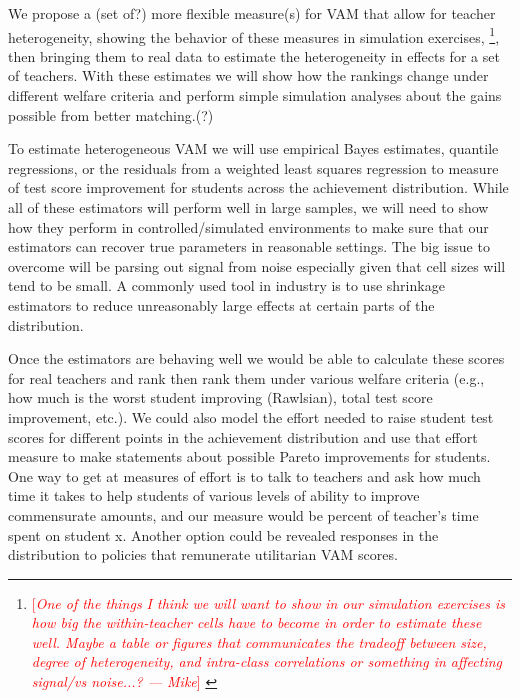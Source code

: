 \documentclass[letterpaper,12pt]{article}
\newcommand\cmnt[2]{\;
{\textcolor{red}{[{\em #1 --- #2}] \;}
}}
\newcommand\Mikenote[1]{\footnote{\cmnt{#1}{Mike}}}
\begin{document}
We propose a (set of?) more flexible measure(s) for VAM that allow for teacher heterogeneity, showing the behavior of these measures in simulation exercises, \Mikenote{One of the things I think we will want to show in our simulation exercises is how big the within-teacher cells have to become in order to estimate these well. Maybe a table or figures that communicates the tradeoff between size, degree of heterogeneity, and intra-class correlations or something in affecting signal/vs noise...?}, then bringing them to real data to estimate the heterogeneity in effects for a set of teachers. With these estimates we will show how the rankings change under different welfare criteria and perform simple simulation analyses about the gains possible from better matching.(?)

To estimate heterogeneous VAM we will use empirical Bayes estimates, quantile regressions, or the residuals from a weighted least squares regression to measure of test score improvement for students across the achievement distribution. While all of these estimators will perform well in large samples, we will need to show how they perform in controlled/simulated environments to make sure that our estimators can recover true parameters in reasonable settings. The big issue to overcome will be parsing out signal from noise especially given that cell sizes will tend to be small. A commonly used tool in industry is to use shrinkage estimators to reduce unreasonably large effects at certain parts of the distribution.

Once the estimators are behaving well we would be able to calculate these scores for real teachers and rank then rank them under various welfare criteria (e.g., how much is the worst student improving (Rawlsian), total test score improvement, etc.). We could also model the effort needed to raise student test scores for different points in the achievement distribution and use that effort measure to make statements about possible Pareto improvements for students. One way to get at measures of effort is to talk to teachers and ask how much time it takes to help students of various levels of ability to improve commensurate amounts, and our measure would be percent of teacher’s time spent on student x. Another option could be revealed responses in the distribution to policies that remunerate utilitarian VAM scores.
\end{document}
